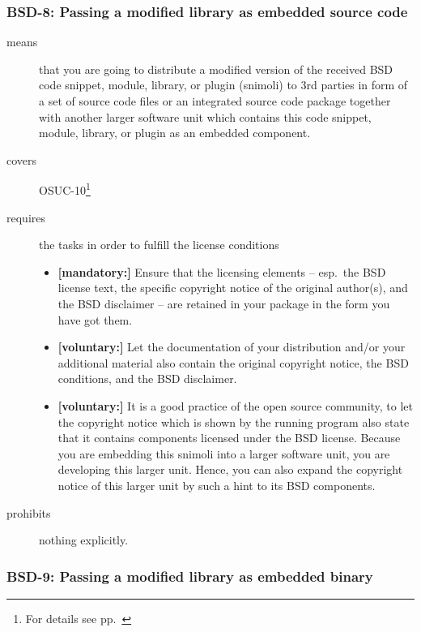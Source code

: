 \subsubsection{BSD-8: Passing a modified library as embedded source code}
\label{OSUC-10-BSD}
\begin{description}
\item[means] that you are going to distribute a modified version of the received
BSD code snippet, module, library, or plugin (snimoli) to 3rd parties in form
of a set of source code files or an integrated source code package together with
another larger software unit which contains this code snippet, module, library,
or plugin as an embedded component.
\item[covers] OSUC-10\footnote{For details see pp.\ \pageref{OSUC-10-DEF}}
\item[requires] the tasks in order to fulfill the license conditions
\begin{itemize}
  \item \textbf{[mandatory:]} Ensure that the licensing elements -- esp.\
  the BSD license text, the specific copyright notice of the original author(s),
  and the BSD disclaimer -- are retained in your package in the form you have got
  them.
  \item \textbf{[voluntary:]} Let the documentation of your distribution
  and/or your additional material also contain the original copyright notice, the
  BSD conditions, and the BSD disclaimer.
 \item \textbf{[voluntary:]} It is a good practice of the open source
  community, to let the copyright notice which is shown by the running program
  also state that it contains components licensed under the BSD license. Because
  you are embedding this snimoli into a larger software unit, you are
  developing this larger unit. Hence, you can also expand the copyright notice
  of this larger unit by such a hint to its BSD components.
\end{itemize}
\item[prohibits] nothing explicitly.
\end{description}


\subsubsection{BSD-9: Passing a modified library as embedded binary}

